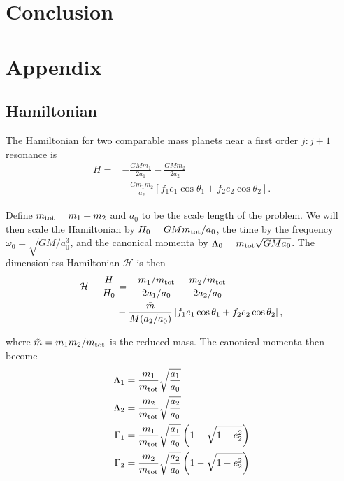 \documentclass[usenatbib]{mnras}
\begin{document}
\section{Conclusion}
\label{sec:org1b1d6cb}

\clearpage

\section{Appendix}
\label{sec:org054391e}
\subsection{Hamiltonian}
\label{sec:orge004f4e}
The Hamiltonian for two comparable mass planets near a first order \(j:j+1\)
resonance is
\begin{align}
  H = & -\frac{G M m_{1}}{2 a_{1}}-\frac{G M m_{2}}{2 a_{2}}\nonumber\\
                & -\frac{G m_{1} m_{2}}{a_{2}}
                  \left[
                  f_{1} e_{1} \cos \theta_{1} 
                  +f_{2} e_{2} \cos \theta_{2}\right].
\end{align}

\noindent Define \(m_{\rm tot} = m_1+m_2\) and \(a_0\) to be the
scale length of the problem.  We will then scale the Hamiltonian by
\(H_0 = GMm_{\rm tot}/a_0\), the time by the frequency \(\omega_0 =
\sqrt{GM/a_0^3}\), and the canonical momenta by \(\Lambda_0 = m_{\rm
tot} \sqrt{GMa_0}\).  The dimensionless Hamiltonian \(\mathcal{H}\) is
then
\begin{align}
  \mathcal{H} \equiv \frac{H}{H_0}
  &= -\frac{m_1/m_{\rm tot}}{2a_1/a_0}
    -\frac{m_2/m_{\rm tot}}{2a_2/a_0}\nonumber\\
  &-\frac{\tilde m}{M (a_2/a_0)}\left[
    f_1e_1\cos\theta_1+f_2e_2\cos\theta_2
    \right],
\end{align}

\noindent
where \(\tilde m = m_1m_2/m_{\rm tot}\) is the reduced mass.
The canonical momenta then become
\begin{align}
  \Lambda_1 &= \frac{m_1}{m_{\rm tot}}\sqrt{\frac{a_1}{a_0}} \\
  \Lambda_2 &= \frac{m_2}{m_{\rm tot}}\sqrt{\frac{a_2}{a_0}} \\
  \Gamma_1 &= \frac{m_1}{m_{\rm tot}}\sqrt{\frac{a_1}{a_0}}
             \left(1-\sqrt{1-e_2^2}\right) \\
  \Gamma_2 &= \frac{m_2}{m_{\rm tot}}\sqrt{\frac{a_2}{a_0}}
             \left(1-\sqrt{1-e_2^2}\right)
\end{align}
\end{document}
